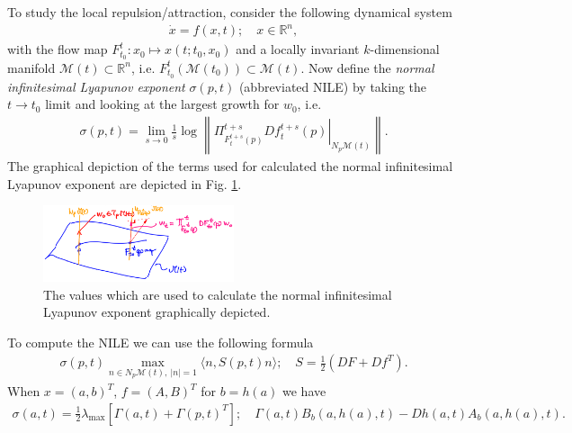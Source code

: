 To study the local repulsion/attraction, consider the following dynamical system
\begin{align}
	\dot{x}= f(x,t);\quad x \in \mathbb{R}^{n},
\end{align}
with the flow map $F_{t_0}^{t}: x_0 \mapsto x(t;t_0, x_0)$ and a locally invariant $k$-dimensional manifold $\mathcal{M}(t) \subset \mathbb{R}^{n}$, i.e. $F_{t_0}^{t}(\mathcal{M}(t_0)) \subset \mathcal{M}(t)$. Now define the \emph{normal infinitesimal Lyapunov exponent} $\sigma(p,t)$ (abbreviated NILE) by taking the $t\to t_0$ limit and looking at the largest growth for $w_0$, i.e.
\begin{align}
	\boxed{
		\sigma(p,t) = \lim_{s\to 0} \frac{1}{s} \log \left\| \left.\Pi_{F_{t}^{t+s}(p)}^{t+s}Df_{t}^{t+s}(p) \right|_{N_{p}\mathcal{M}(t)} \right\|. 
	}
\end{align}
The graphical depiction of the terms used for calculated the normal infinitesimal Lyapunov exponent are depicted in Fig. \ref{fig:NILE_def}.
\begin{figure}[h!]
	\centering
	\includegraphics[width=0.5\textwidth]{figures/ch9/24NILE_def.png}
	\caption{The values which are used to calculate the normal infinitesimal Lyapunov exponent graphically depicted.}
	\label{fig:NILE_def}
\end{figure}

To compute the NILE we can use the following formula
\begin{align}
	\boxed{\sigma(p,t) \max_{n\in N_{p}\mathcal{M}(t),\ |n|=1} \langle n, S(p,t)n\rangle;\quad S = \frac{1}{2}\left( DF + Df^{T}\right). }
\end{align}
When $x = (a,b)^{T}$, $f=(A,B)^{T}$ for $b= h(a)$ we have
\begin{align}
	\sigma(a,t) = \frac{1}{2}\lambda _{ \textrm{max} }\left[ \Gamma(a,t) + \Gamma(p,t)^{T} \right];\quad \Gamma(a,t) B_{b} (a, h(a),t) - Dh(a,t) A_{b}(a, h(a),t).
\end{align}

